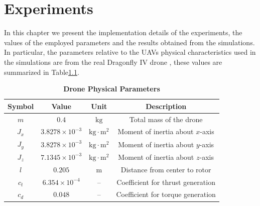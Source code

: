 \chapter{Experiments}
In this chapter we present the implementation details of the experiments,
the values of the employed parameters and the results obtained from the simulations.
In particular, the parameters relative to the UAVs physical
characteristics used in the simulations are from 
the real Dragonfly IV drone \cite{drone}, these values are
summarized in Table\ref{tab:drone_parameters}.
\begin{table}[h!]
\centering
\caption{\textbf{Drone Physical Parameters}}
\begin{tabular}{c c c c}
\hline\hline
\textbf{Symbol}  & \textbf{Value}       & \textbf{Unit}         & \textbf{Description} \\ \hline\hline
\(m\)           & \(0.4\)              & \(\text{kg}\)          & Total mass of the drone \\
\(J_x\)         & \(3.8278 \times 10^{-3}\) & \(\text{kg}\cdot\text{m}^2\) & Moment of inertia about $x$-axis \\
\(J_y\)         & \(3.8278 \times 10^{-3}\) & \(\text{kg}\cdot\text{m}^2\) & Moment of inertia about $y$-axis \\
\(J_z\)         & \(7.1345 \times 10^{-3}\) & \(\text{kg}\cdot\text{m}^2\) & Moment of inertia about $z$-axis \\
\(l\)           & \(0.205\)            & \(\text{m}\)           & Distance from center to rotor \\
\(c_t\)         & \(6.354 \times 10^{-4}\) & --                     & Coefficient for thrust generation \\
\(c_d\)         & \(0.048\)            & --                     & Coefficient for torque generation \\
\hline\hline
\end{tabular}
\label{tab:drone_parameters}
\end{table}


